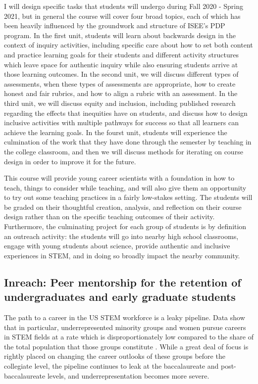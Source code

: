 \documentclass[aasms,12pt]{article}
\begin{document}
I will design specific tasks that students will undergo during Fall 2020 - Spring 2021, but in general the course will cover four broad topics, each of which has been heavily influenced by the groundwork and structure of ISEE's PDP program.
In the first unit, students will learn about backwards design in the context of inquiry activities, including specific care about how to set both content and practice learning goals for their students and different activity structures which leave space for authentic inquiry while also ensuring students arrive at those learning outcomes.
In the second unit, we will discuss different types of assessments, when these types of assessments are appropriate, how to create honest and fair rubrics, and how to align a rubric with an assessment.
In the third unit, we will discuss equity and inclusion, including published research regarding the effects that inequities have on students, and discuss how to design inclusive activities with multiple pathways for success so that all learners can achieve the learning goals.
In the fourst unit, students will experience the culmination of the work that they have done through the semester by teaching in the college classroom, and then we will discuss methods for iterating on course design in order to improve it for the future.

This course will provide young career scientists with a foundation in how to teach, things to consider while teaching, and will also give them an opportunity to try out some teaching practices in a fairly low-stakes setting.
The students will be graded on their thoughtful creation, analysis, and reflection on their course design rather than on the specific teaching outcomes of their activity.
Furthermore, the culminating project for each group of students is by definition an outreach activity: the students will go into nearby high school classrooms, engage with young students about science, provide authentic and inclusive experiences in STEM, and in doing so broadly impact the nearby community.

\subsection{Inreach: Peer mentorship for the retention of undergraduates and early graduate students}
The path to a career in the US STEM workforce is a leaky pipeline.
Data show that in particular, underrepresented minority groups and women pursue careers in STEM fields at a rate which is disproportionately low compared to the share of the total population that those groups constitute \citep{corbett&hill2015, nsf2019}.
While a great deal of focus is rightly placed on changing the career outlooks of these groups before the collegiate level, the pipeline continues to leak at the baccalaureate and post-baccalaureate levels, and underrepresentation becomes more severe.
\end{document}
